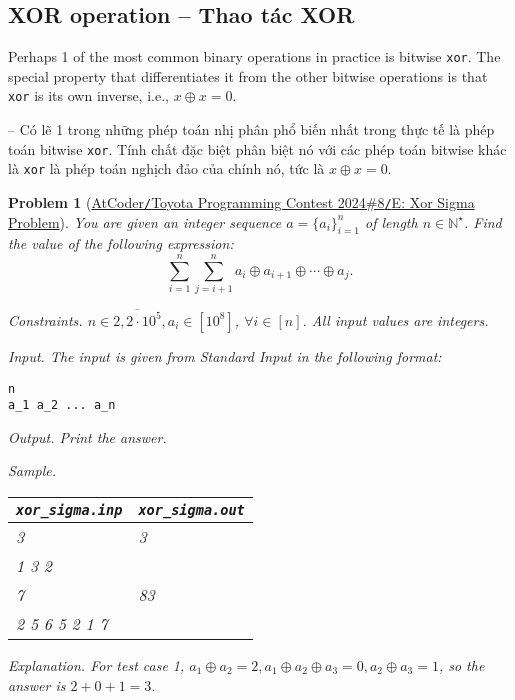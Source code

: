 \documentclass{article}
\newtheorem{problem}{Problem}
\begin{document}

\subsection{XOR operation -- Thao tác XOR}
Perhaps 1 of the most common binary operations in practice is bitwise {\tt xor}. The special property that differentiates it from the other bitwise operations is that {\tt xor} is its own inverse, i.e., $x\oplus x = 0$.

-- Có lẽ 1 trong những phép toán nhị phân phổ biến nhất trong thực tế là phép toán bitwise {\tt xor}. Tính chất đặc biệt phân biệt nó với các phép toán bitwise khác là {\tt xor} là phép toán nghịch đảo của chính nó, tức là $x\oplus x = 0$.

\begin{problem}[\href{https://atcoder.jp/contests/abc365/tasks/abc365_e}{AtCoder{\tt/}Toyota Programming Contest 2024\#8{\tt/}E: Xor Sigma Problem}]
    You are given an integer sequence $a = \{a_i\}_{i=1}^n$ of length $n\in\mathbb{N}^\star$. Find the value of the following expression:
    \begin{equation*}
        \sum_{i=1}^n\sum_{j = i + 1}^n a_i\oplus a_{i+1}\oplus\cdots\oplus a_j.
    \end{equation*}
    \item {\sf Constraints.} $n\in\overline{2,2\cdot10^5},a_i\in[10^8]$, $\forall i\in[n]$. All input values are integers.
    \item {\sf Input.} The input is given from Standard Input in the following format:
    \begin{verbatim}
n
a_1 a_2 ... a_n
    \end{verbatim}
    \item {\sf Output.} Print the answer.
    \item {\sf Sample.}
    \begin{table}[H]
        \centering
        \begin{tabular}{|l|l|}
            \hline
            \verb|xor_sigma.inp| & \verb|xor_sigma.out| \\
            \hline
            3 & 3 \\
            1 3 2 & \\
            \hline
            7 & 83 \\
            2 5 6 5 2 1 7 & \\
            \hline
        \end{tabular}
    \end{table}
    \item {\sf Explanation.} For test case 1, $a_1\oplus a_2 = 2,a_1\oplus a_2\oplus a_3 = 0,a_2\oplus a_3 = 1$, so the answer is $2 + 0 + 1 = 3$.
\end{problem}
\end{document}
